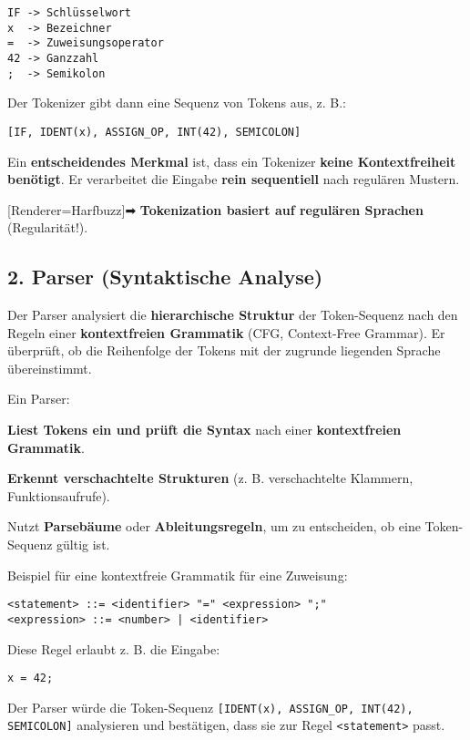 \documentclass[a4paper]{article}
\newcommand{\uliji}[1]{
  {\setmainfont{Noto Color Emoji}[Renderer=Harfbuzz]{#1}}
}
\begin{document}
\begin{verbatim}
IF -> Schlüsselwort
x  -> Bezeichner
=  -> Zuweisungsoperator
42 -> Ganzzahl
;  -> Semikolon
\end{verbatim}
Der Tokenizer gibt dann eine Sequenz von Tokens aus, z. B.:

\begin{verbatim}
[IF, IDENT(x), ASSIGN_OP, INT(42), SEMICOLON]
\end{verbatim}
Ein \textbf{entscheidendes Merkmal} ist, dass ein Tokenizer \textbf{keine Kontextfreiheit benötigt}. Er verarbeitet die Eingabe \textbf{rein sequentiell} nach regulären Mustern.

\uliji{➡} \textbf{Tokenization basiert auf regulären Sprachen} (Regularität!).
\subsection*{2. Parser (Syntaktische Analyse)}
Der Parser analysiert die \textbf{hierarchische Struktur} der Token-Sequenz nach den Regeln einer \textbf{kontextfreien Grammatik} (CFG, Context-Free Grammar). Er überprüft, ob die Reihenfolge der Tokens mit der zugrunde liegenden Sprache übereinstimmt.

Ein Parser:
\begin{itemize}
  \begin{item}
    \textbf{Liest Tokens ein und prüft die Syntax} nach einer \textbf{kontextfreien Grammatik}.
  \end{item}
  \begin{item}
    \textbf{Erkennt verschachtelte Strukturen} (z. B. verschachtelte Klammern, Funktionsaufrufe).
  \end{item}
  \begin{item}
    Nutzt \textbf{Parsebäume} oder \textbf{Ableitungsregeln}, um zu entscheiden, ob eine Token-Sequenz gültig ist.
  \end{item}
\end{itemize}
Beispiel für eine kontextfreie Grammatik für eine Zuweisung:

\begin{verbatim}
<statement> ::= <identifier> "=" <expression> ";"
<expression> ::= <number> | <identifier>
\end{verbatim}
Diese Regel erlaubt z. B. die Eingabe:

\begin{verbatim}
x = 42;
\end{verbatim}
Der Parser würde die Token-Sequenz \texttt{[IDENT(x), ASSIGN_OP, INT(42), SEMICOLON]} analysieren und bestätigen, dass sie zur Regel \texttt{<statement>} passt.
\end{document}

